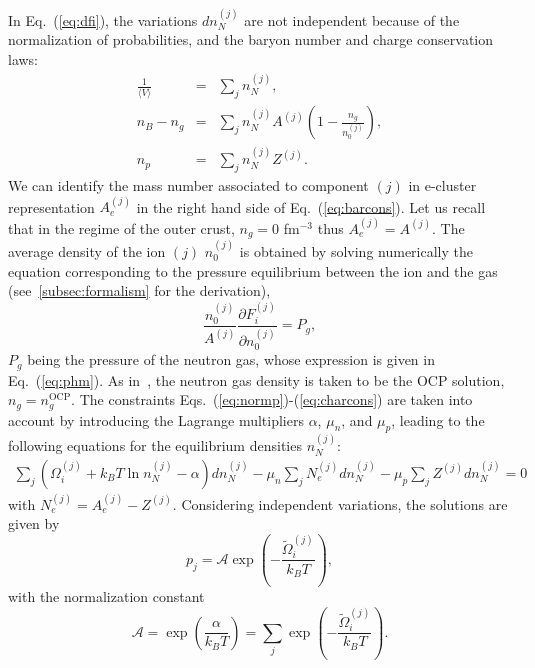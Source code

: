 In Eq.~(\ref{eq:dfi}), the variations $dn_N^{(j)}$ are not independent because 
of the normalization of probabilities, and the baryon number and charge 
conservation laws:
%
\begin{eqnarray}
  \frac{1}{\langle V\rangle} &=& \sum_j n_N^{(j)},\label{eq:normp}\\
  n_B - n_g &=& 
  \sum_j n_N^{(j)} A^{(j)}
  \left(1-\frac{n_g}{n_0^{(j)}}\right),\label{eq:barcons}\\
  n_p &=& \sum_j n_N^{(j)} Z^{(j)}\label{eq:charcons}.
\end{eqnarray}
%
We can identify the mass number associated to component $(j)$ in e-cluster 
representation $A_e^{(j)}$ in the right hand side of Eq.~(\ref{eq:barcons}).
Let us recall that in the regime of the outer crust, $n_g = 0$ fm$^{-3}$ thus
$A_e^{(j)} = A^{(j)}$. The average density of the ion $(j)$ $n_0^{(j)}$ is
obtained by solving numerically the equation corresponding to the pressure 
equilibrium between the ion and the gas (see~\ref{subsec:formalism} for the 
derivation),
%
\begin{equation}
  \frac{n_0^{(j)}}{A^{(j)}}\frac{\partial F_i^{(j)}} {\partial n_0^{(j)}} 
  = P_g,
\end{equation}
%
$P_g$ being the pressure of the neutron gas, whose expression is given in 
Eq.~(\ref{eq:phm}). As in~\cite{Grams2018}, the neutron gas density is taken to 
be the OCP solution, $n_g = n_g^{\text{OCP}}$.
The constraints Eqs.~(\ref{eq:normp})-(\ref{eq:charcons}) are taken into 
account by introducing the Lagrange multipliers $\alpha$, $\mu_n$, and $\mu_p$, 
leading to the following equations for the equilibrium densities $n_N^{(j)}$:
%
\begin{eqnarray}
  \sum_j \left(\Omega_{i}^{(j)} + k_B T \ln n_N^{(j)} 
  - \alpha\right)dn_N^{(j)} 
  - \mu_n \sum_j N_e^{(j)}dn_N^{(j)} - \mu_p \sum_j Z^{(j)} dn_N^{(j)}  
  = 0
\end{eqnarray}
%
with $N_e^{(j)} = A_e^{(j)} - Z^{(j)}$.
Considering independent variations, the solutions are given by
%
\begin{equation}
  p_j = \mathcal{A}\exp\left(-\frac{\tilde{\Omega}_{i}^{(j)}}{k_B
  T}\right),\label{eq:pj}
\end{equation}
%
with the normalization constant
%
\begin{equation}
  \mathcal{A} = \exp\left(\frac{\alpha}{k_B T}\right) = \sum_j
  \exp\left(-\frac{\tilde{\Omega}_{i}^{(j)}}{k_B T}\right).
\end{equation}
%

